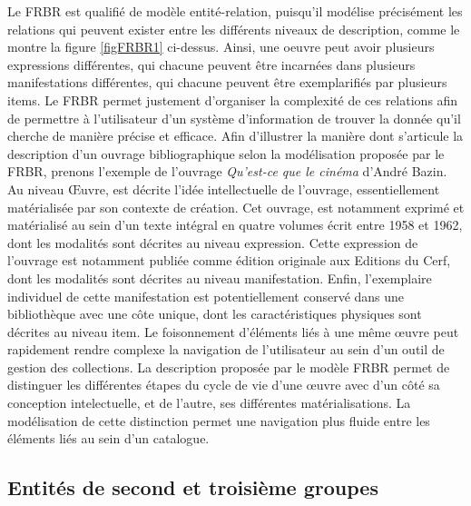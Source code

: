 Le \gls{FRBR} est qualifié de modèle entité-relation, puisqu'il modélise précisément les relations qui peuvent exister entre les différents niveaux de description, comme le montre la figure \ref{figFRBR1} ci-dessus. Ainsi, une \gls{oeuvre} peut avoir plusieurs \gls{expression}s différentes, qui chacune peuvent être incarnées dans plusieurs \gls{manifestation}s différentes, qui chacune peuvent être exemplarifiés par plusieurs \gls{item}s. Le \gls{FRBR} permet justement d'organiser la complexité de ces relations afin de permettre à l'utilisateur d'un système d'information de trouver la donnée qu'il cherche de manière précise et efficace. Afin d’illustrer la manière dont s’articule la description d’un ouvrage bibliographique selon la modélisation proposée par le \gls{FRBR}, prenons l'exemple de l'ouvrage \textit{Qu'est-ce que le cinéma} d'André Bazin. Au niveau Œuvre, est décrite l'idée intellectuelle de l'ouvrage, essentiellement matérialisée par son contexte de création. Cet ouvrage, est notamment exprimé et matérialisé au sein d'un texte intégral en quatre volumes écrit entre 1958 et 1962, dont les modalités sont décrites au niveau \gls{expression}. Cette \gls{expression} de l’ouvrage est notamment publiée comme édition originale aux Editions du Cerf, dont les modalités sont décrites au niveau \gls{manifestation}. Enfin, l’exemplaire individuel de cette \gls{manifestation} est potentiellement conservé dans une bibliothèque avec une côte unique, dont les caractéristiques physiques sont décrites au niveau \gls{item}. Le foisonnement d’éléments liés à une même œuvre peut rapidement rendre complexe la navigation de l’utilisateur au sein d’un outil de gestion des collections. La description proposée par le modèle \gls{FRBR} permet de distinguer les différentes étapes du cycle de vie d’une œuvre avec d'un côté sa conception intelectuelle, et de l'autre, ses différentes matérialisations. La modélisation de cette distinction permet une navigation plus fluide entre les éléments liés au sein d’un catalogue.  

\subsection{Entités de second et troisième groupes}

